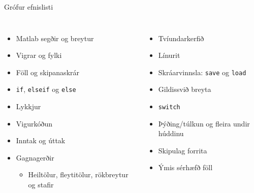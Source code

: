 \documentclass{beamer}
\begin{document}
\begin{frame}{Grófur efnislisti}
\begin{columns}
\begin{itemize}
 \item Matlab segðir og breytur
 \item Vigrar og fylki
 \item Föll og skipanaskrár
 \item \texttt{if}, \texttt{elseif} og \texttt{else}
 \item Lykkjur
 \item Vigurkóðun
 \item Inntak og úttak
 \item Gagnagerðir
 \begin{itemize}
  \item Heiltölur, fleytitölur, rökbreytur og stafir
 \end{itemize}
\end{itemize}
\begin{itemize}
 \item Tvíundarkerfið
 \item Línurit
 \item Skráarvinnsla: \texttt{save} og \texttt{load}
 \item Gildissvið breyta
 \item \texttt{switch}
 \item Þýðing/túlkun og fleira undir húddinu
 \item Skipulag forrita
 \item Ýmis sérhæfð föll
\end{itemize}
\end{columns}
\end{frame}
\end{document}
